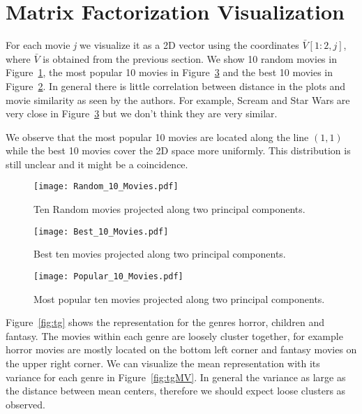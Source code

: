 \section{Matrix Factorization Visualization}

For each movie \textit{j} we visualize it as a 2D vector using the coordinates $\bar{V}[1:2,j]$, where $\bar{V}$ is obtained from the previous section. We show 10 random movies in Figure~\ref{fig:tenRandom}, the most popular 10 movies in Figure~\ref{fig:tenMostPopular} and the best 10 movies in Figure~\ref{fig:tenBest}. In general there is little correlation between distance in the plots and movie similarity as seen by the authors. For example, Scream and Star Wars are very close in Figure~\ref{fig:tenMostPopular} but we don't think they are very similar.

We observe that the most popular 10 movies are located along the line $(1,1)$ while the best 10 movies cover the 2D space more uniformly. This distribution is still unclear and it might be a coincidence.  

\begin{figure}[hptb]
\centering
\texttt{[image: Random\_10\_Movies.pdf]}
 \caption{Ten Random movies projected along two principal components.}
\label{fig:tenRandom}
\end{figure}


\begin{figure}[hptb]
\centering
\texttt{[image: Best\_10\_Movies.pdf]}
 \caption{Best ten movies projected along two principal components.}
\label{fig:tenBest}
\end{figure}


\begin{figure}[hptb]
\centering
\texttt{[image: Popular\_10\_Movies.pdf]}
 \caption{Most popular ten movies projected along two principal components.}
\label{fig:tenMostPopular}
\end{figure}

Figure~\ref{fig:tg} shows the representation for the genres horror, children and fantasy. The movies within each genre are loosely cluster together, for example horror movies are mostly located on the bottom left corner and fantasy movies on the upper right corner. We can visualize the mean representation with its variance for each genre in Figure~\ref{fig:tgMV}. In general the variance as large as the distance between mean centers, therefore we should expect loose clusters as observed. 


